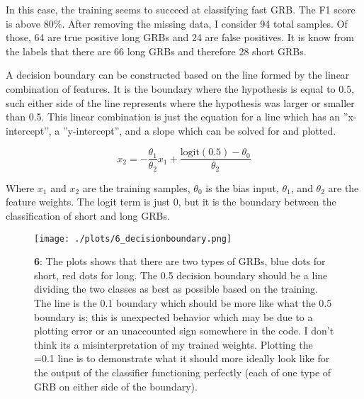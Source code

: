 In this case, the training seems to succeed at classifying fast GRB. The F1 score is above 80\%. After removing the missing data, I consider 94 total samples. Of those, 64 are true positive long GRBs and 24 are false positives. It is know from the labels that there are 66 long GRBs and therefore 28 short GRBs.

A decision boundary can be constructed based on the line formed by the linear combination of features. It is the boundary where the hypothesis is equal to 0.5, such either side of the line represents where the hypothesis was larger or smaller than 0.5. This linear combination is just the equation for a line which has an ''x-intercept'', a ''y-intercept'', and a slope which can be solved for and plotted.

\begin{equation}
  x_2 = -\frac{\theta_1}{\theta_2}x_1 + \frac{\text{logit}(0.5)-\theta_0}{\theta_2}
\end{equation}

Where $x_1$ and $x_2$ are the training samples, $\theta_0$ is the bias input, $\theta_1$, and $\theta_2$ are the feature weights. The logit term is just 0, but it is the boundary between the classification of short and long GRBs.

\begin{figure}[h!]
  \centering
  \texttt{[image: ./plots/6\_decisionboundary.png]}
  \caption{\textbf{6}: The plots shows that there are two types of GRBs, blue dots for short, red dots for long. The 0.5 decision boundary should be a line dividing the two classes as best as possible based on the training. The line is the 0.1 boundary which should be more like what the 0.5 boundary is; this is unexpected behavior which may be due to a plotting error or an unaccounted sign somewhere in the code. I don't think its a misinterpretation of my trained weights. Plotting the =0.1 line is to demonstrate what it should more ideally look like for the output of the classifier functioning perfectly (each of one type of GRB on either side of the boundary).}
  \label{fig:decisionboundary}
\end{figure}